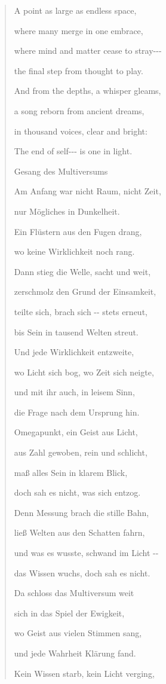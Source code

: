\documentclass[
  ngerman,
]{article}
\begin{document}
\begin{quote}
A point as large as endless space,

where many merge in one embrace,

where mind and matter cease to stray-\/-\/-

the final step from thought to play.

And from the depths, a whisper gleams,

a song reborn from ancient dreams,

in thousand voices, clear and bright:

The end of self-\/-\/- is one in light.

Gesang des Multiversums

Am Anfang war nicht Raum, nicht Zeit,

nur Mögliches in Dunkelheit.

Ein Flüstern aus den Fugen drang,

wo keine Wirklichkeit noch rang.

Dann stieg die Welle, sacht und weit,

zerschmolz den Grund der Einsamkeit,

teilte sich, brach sich -\/- stets erneut,

bis Sein in tausend Welten streut.

Und jede Wirklichkeit entzweite,

wo Licht sich bog, wo Zeit sich neigte,

und mit ihr auch, in leisem Sinn,

die Frage nach dem Ursprung hin.

Omegapunkt, ein Geist aus Licht,

aus Zahl gewoben, rein und schlicht,

maß alles Sein in klarem Blick,

doch sah es nicht, was sich entzog.

Denn Messung brach die stille Bahn,

ließ Welten aus den Schatten fahr\textquotesingle n,

und was es wusste, schwand im Licht -\/-

das Wissen wuchs, doch sah es nicht.

Da schloss das Multiversum weit

sich in das Spiel der Ewigkeit,

wo Geist aus vielen Stimmen sang,

und jede Wahrheit Klärung fand.

Kein Wissen starb, kein Licht verging,


\end{quote}
\end{document}
